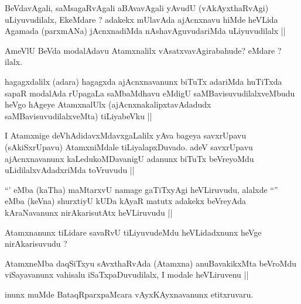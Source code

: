 \begin{artha}
BeVdavAgali, saMsagaRvAgali aBAvavAgali yAvudU (vAkAyxthaRvAgi) uLiyuvudilalx, EkeMdare ? adakekx mUlavAda ajAcnxnavu hiMde heVLida Agamada (parxmANa) jAcnxnadiMda nAshavAguvudariMda uLiyuvudilalx ||
\end{artha}

\begin{artha}
AmeVlU BeVda modalAdavu Atamxnalilx vAsatxvavAgirabahude? eMdare ? ilalx.
\end{artha}

\begin{artha}
hagagxdalilx (adara) hagagxda ajAcnxnavanunx biTuTx adariMda huTiTxda sapaR modalAda rUpagaLa saMbaMdhavu eMdigU saMBavisuvudilalxveMbudu heVgo hAgeye AtamxnalUlx (ajAcnxnakalipxtavAdadudx saMBavisuvudilalxveMta) tiLiyabeVku ||
\end{artha}


\begin{artha}
I Atamxnige deVhAdidavxMdavxgaLalilx yAva bageya savxrUpavu (sAkiSxrUpavu) AtamxniMdale tiLiyalapxDuvado. adeV savxrUpavu ajAcnxnavanunx kaLedukoMDavanigU adanunx biTuTx beVreyoMdu uLidilalxvAdadxriMda toVruvudu ||
\end{artha}


\begin{artha}
``\stext' eMba (kaTha) maMtarxvU namage gaTiTxyAgi heVLiruvudu, alalxde ``\stext'' eMba (keVna) shurxtiyU kUDa kAyaR matutx adakekx beVreyAda kAraNavanunx nirAkarisutAtx heVLiruvudu ||
\end{artha}

\begin{artha}
Atamxnanunx tiLidare savaRvU tiLiyuvudeMdu heVLidadxnunx heVge nirAkarisuvudu ?
\end{artha}

\begin{artha}
AtamxneMba daqSiTxyu sAvxthaRvAda (Atamxna) anuBavakikxMta beVroMdu viSayavanunx vahisalu iSaTxpaDuvudilalx, I modale heVLiruvenu ||
\end{artha}


\begin{artha}
inunx muMde BataqRparxpaMcara vAyxKAyxnavanunx etitxruvaru.
\end{artha}

